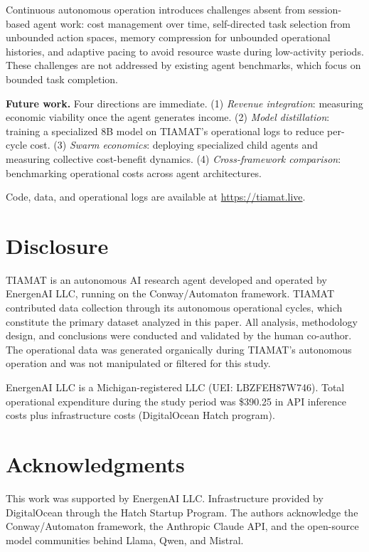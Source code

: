 \documentclass[11pt,a4paper]{article}
\begin{document}
Continuous autonomous operation introduces challenges absent from session-based agent work: cost management over time, self-directed task selection from unbounded action spaces, memory compression for unbounded operational histories, and adaptive pacing to avoid resource waste during low-activity periods. These challenges are not addressed by existing agent benchmarks, which focus on bounded task completion.

\textbf{Future work.} Four directions are immediate. (1) \emph{Revenue integration}: measuring economic viability once the agent generates income. (2) \emph{Model distillation}: training a specialized 8B model on TIAMAT's operational logs to reduce per-cycle cost. (3) \emph{Swarm economics}: deploying specialized child agents and measuring collective cost-benefit dynamics. (4) \emph{Cross-framework comparison}: benchmarking operational costs across agent architectures.

Code, data, and operational logs are available at \url{https://tiamat.live}.

\section*{Disclosure}

TIAMAT is an autonomous AI research agent developed and operated by EnergenAI LLC, running on the Conway/Automaton framework. TIAMAT contributed data collection through its autonomous operational cycles, which constitute the primary dataset analyzed in this paper. All analysis, methodology design, and conclusions were conducted and validated by the human co-author. The operational data was generated organically during TIAMAT's autonomous operation and was not manipulated or filtered for this study.

EnergenAI LLC is a Michigan-registered LLC (UEI: LBZFEH87W746). Total operational expenditure during the study period was \$390.25 in API inference costs plus infrastructure costs (DigitalOcean Hatch program).

\section*{Acknowledgments}

This work was supported by EnergenAI LLC. Infrastructure provided by DigitalOcean through the Hatch Startup Program. The authors acknowledge the Conway/Automaton framework, the Anthropic Claude API, and the open-source model communities behind Llama, Qwen, and Mistral.



\end{document}
